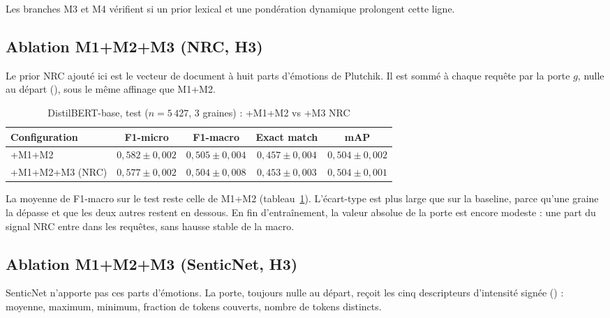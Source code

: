 Les branches M3 et M4 vérifient si un prior lexical et une pondération
dynamique prolongent cette ligne.

\subsection{Ablation M1+M2+M3 (NRC, H3)}
\label{sec:expe-m3-nrc-h3}

Le prior NRC ajouté ici est le vecteur de document à huit parts
d'émotions de Plutchik. Il est sommé à chaque requête par la porte $g$,
nulle au départ (), sous le même affinage que
M1+M2.

\begin{table}[H]
\centering
\caption{DistilBERT-base, test ($n{=}5\,427$, 3 graines) : +M1+M2 vs +M3 NRC}
\label{tab:expe-m3-nrc-distilbert}
\renewcommand{\arraystretch}{1.2}
\begin{tabular}{|l|c|c|c|c|}
\hline
\textbf{Configuration} & \textbf{F1-micro} & \textbf{F1-macro} & \textbf{Exact match} & \textbf{mAP} \\
\hline
+M1+M2 & $0{,}582 \pm 0{,}002$ & $0{,}505 \pm 0{,}004$ & $0{,}457 \pm 0{,}004$ & $0{,}504 \pm 0{,}002$ \\
\hline
+M1+M2+M3 (NRC) & $0{,}577 \pm 0{,}002$ & $0{,}504 \pm 0{,}008$ & $0{,}453 \pm 0{,}003$ & $0{,}504 \pm 0{,}001$ \\
\hline
\end{tabular}
\end{table}

La moyenne de F1-macro sur le test reste celle de M1+M2
(tableau~\ref{tab:expe-m3-nrc-distilbert}). L'écart-type est plus large
que sur la baseline, parce qu'une graine la dépasse et que les deux
autres restent en dessous. En fin d'entraînement, la valeur absolue de
la porte est encore modeste : une part du signal NRC entre dans les
requêtes, sans hausse stable de la macro.

\subsection{Ablation M1+M2+M3 (SenticNet, H3)}
\label{sec:expe-m3-senticnet-h3}

SenticNet n'apporte pas ces parts d'émotions. La porte, toujours nulle
au départ, reçoit les cinq descripteurs d'intensité signée
() : moyenne, maximum, minimum, fraction de
tokens couverts, nombre de tokens distincts.

